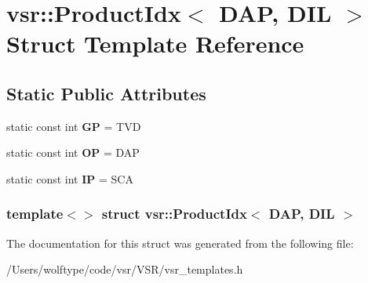 \hypertarget{structvsr_1_1_product_idx_3_01_d_a_p_00_01_d_i_l_01_4}{\section{vsr\-:\-:Product\-Idx$<$ D\-A\-P, D\-I\-L $>$ Struct Template Reference}
\label{structvsr_1_1_product_idx_3_01_d_a_p_00_01_d_i_l_01_4}
}
\subsection*{Static Public Attributes}
\begin{DoxyCompactItemize}
\item 
\hypertarget{structvsr_1_1_product_idx_3_01_d_a_p_00_01_d_i_l_01_4_a76bd7eb7e0b331ae8d058adccbba8b81}{static const int {\bfseries G\-P} = T\-V\-D}\label{structvsr_1_1_product_idx_3_01_d_a_p_00_01_d_i_l_01_4_a76bd7eb7e0b331ae8d058adccbba8b81}

\item 
\hypertarget{structvsr_1_1_product_idx_3_01_d_a_p_00_01_d_i_l_01_4_aa2e09d76ce0cad47e462d838797ae270}{static const int {\bfseries O\-P} = D\-A\-P}\label{structvsr_1_1_product_idx_3_01_d_a_p_00_01_d_i_l_01_4_aa2e09d76ce0cad47e462d838797ae270}

\item 
\hypertarget{structvsr_1_1_product_idx_3_01_d_a_p_00_01_d_i_l_01_4_a9385af2d992f16e75eeea9dfa3828cc5}{static const int {\bfseries I\-P} = S\-C\-A}\label{structvsr_1_1_product_idx_3_01_d_a_p_00_01_d_i_l_01_4_a9385af2d992f16e75eeea9dfa3828cc5}

\end{DoxyCompactItemize}
\subsubsection*{template$<$$>$ struct vsr\-::\-Product\-Idx$<$ D\-A\-P, D\-I\-L $>$}



The documentation for this struct was generated from the following file\-:\begin{DoxyCompactItemize}
\item 
/\-Users/wolftype/code/vsr/\-V\-S\-R/vsr\-\_\-templates.\-h\end{DoxyCompactItemize}
